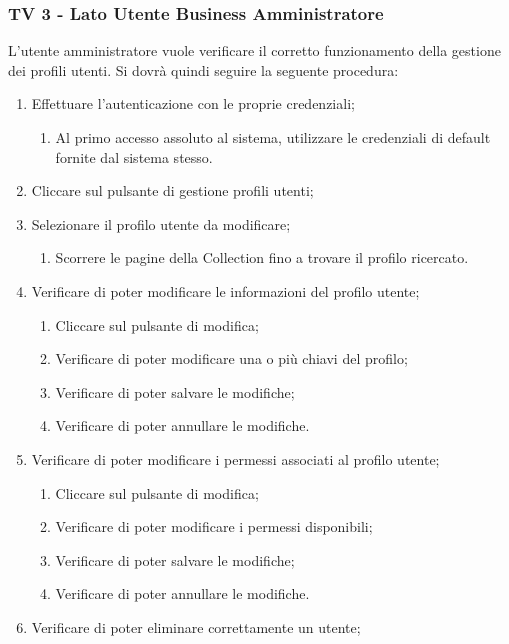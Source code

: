\subsubsection{TV 3 - Lato Utente Business Amministratore}

L’utente amministratore vuole verificare il corretto funzionamento della gestione dei profili utenti.
Si dovrà quindi seguire la seguente procedura:

\begin{enumerate}
\item Effettuare l'autenticazione con le proprie credenziali;
\begin{enumerate}
\item Al primo accesso assoluto al sistema, utilizzare le credenziali di default fornite dal sistema stesso.
\end{enumerate}
\item Cliccare sul pulsante di gestione profili utenti;
\item Selezionare il profilo utente da modificare;
\begin{enumerate}
\item Scorrere le pagine della Collection fino a trovare il profilo ricercato.
\end{enumerate}
\item Verificare di poter modificare le informazioni del profilo utente;
\begin{enumerate}
\item Cliccare sul pulsante di modifica;
\item Verificare di poter modificare una o più chiavi del profilo;
\item Verificare di poter salvare le modifiche;
\item Verificare di poter annullare le modifiche.
\end{enumerate}
\item Verificare di poter modificare i permessi associati al profilo utente;
\begin{enumerate}
\item Cliccare sul pulsante di modifica;
\item Verificare di poter modificare i permessi disponibili;
\item Verificare di poter salvare le modifiche;
\item Verificare di poter annullare le modifiche.
\end{enumerate}
\item Verificare di poter eliminare correttamente un utente;
\begin{enumerate}

\end{enumerate}
\end{enumerate}

